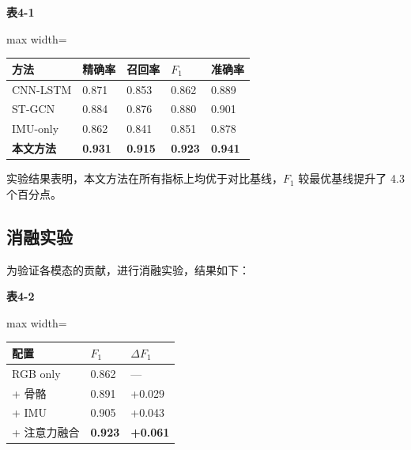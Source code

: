 \noindent\textbf{表4-1 }


\begin{table}[H]
\centering
\begin{adjustbox}{max width=\linewidth}
\begin{tabular}{l|l|l|l|l}
\toprule
\textbf{方法} & \textbf{精确率} & \textbf{召回率} & \textbf{$F_1$} & \textbf{准确率} \\
\midrule
CNN-LSTM & 0.871 & 0.853 & 0.862 & 0.889 \\
ST-GCN & 0.884 & 0.876 & 0.880 & 0.901 \\
IMU-only & 0.862 & 0.841 & 0.851 & 0.878 \\
\textbf{本文方法} & \textbf{0.931} & \textbf{0.915} & \textbf{0.923} & \textbf{0.941} \\
\bottomrule
\end{tabular}
\end{adjustbox}
\end{table}

实验结果表明，本文方法在所有指标上均优于对比基线，$F_1$ 较最优基线提升了 4.3 个百分点。


\subsection{消融实验}\label{4-3-消融实验}

为验证各模态的贡献，进行消融实验，结果如下：


\noindent\textbf{表4-2 }


\begin{table}[H]
\centering
\begin{adjustbox}{max width=\linewidth}
\begin{tabular}{l|l|l}
\toprule
\textbf{配置} & \textbf{$F_1$} & \textbf{$\Delta F_1$} \\
\midrule
RGB only & 0.862 & — \\
+ 骨骼 & 0.891 & +0.029 \\
+ IMU & 0.905 & +0.043 \\
+ 注意力融合 & \textbf{0.923} & \textbf{+0.061} \\
\bottomrule
\end{tabular}
\end{adjustbox}
\end{table}

